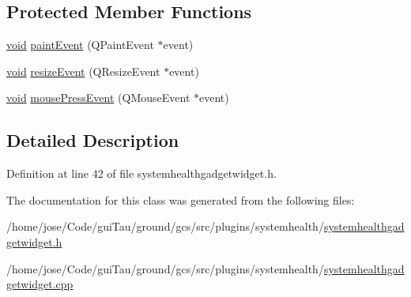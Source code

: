 \subsection*{Protected Member Functions}
\begin{DoxyCompactItemize}
\item 
\hyperlink{group___u_a_v_objects_plugin_ga444cf2ff3f0ecbe028adce838d373f5c}{void} \hyperlink{group___system_health_plugin_gaefb5569e2941f96ea452bb2e43575aed}{paint\-Event} (Q\-Paint\-Event $\ast$event)
\item 
\hyperlink{group___u_a_v_objects_plugin_ga444cf2ff3f0ecbe028adce838d373f5c}{void} \hyperlink{group___system_health_plugin_gacfa993929fde9cc3153dafa5a6509d65}{resize\-Event} (Q\-Resize\-Event $\ast$event)
\item 
\hyperlink{group___u_a_v_objects_plugin_ga444cf2ff3f0ecbe028adce838d373f5c}{void} \hyperlink{group___system_health_plugin_ga2558a85d789a3f51c15c92ac329b26d7}{mouse\-Press\-Event} (Q\-Mouse\-Event $\ast$event)
\end{DoxyCompactItemize}


\subsection{Detailed Description}


Definition at line 42 of file systemhealthgadgetwidget.\-h.



The documentation for this class was generated from the following files\-:\begin{DoxyCompactItemize}
\item 
/home/jose/\-Code/gui\-Tau/ground/gcs/src/plugins/systemhealth/\hyperlink{systemhealthgadgetwidget_8h}{systemhealthgadgetwidget.\-h}\item 
/home/jose/\-Code/gui\-Tau/ground/gcs/src/plugins/systemhealth/\hyperlink{systemhealthgadgetwidget_8cpp}{systemhealthgadgetwidget.\-cpp}\end{DoxyCompactItemize}

